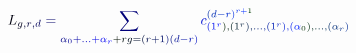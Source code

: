 \documentclass[12pt]{article}
\begin{document}
\makeatletter
\renewcommand*{\@textcolor}[3]{%
  \protect\leavevmode
  \begingroup
    \color#1{#2}#3%
  \endgroup
}
\makeatother
\begin{displaymath}
\mathcolor[RGB]{0,0,15}{L} _ { \mathcolor[RGB]{0,0,30}{g} \mathcolor[RGB]{0,0,45}{,} \mathcolor[RGB]{0,0,60}{r} \mathcolor[RGB]{0,0,75}{,} \mathcolor[RGB]{0,0,90}{d} } \mathcolor[RGB]{0,0,105}{=} \mathcolor[RGB]{0,0,120}{\sum} _ { \mathcolor[RGB]{0,0,135}{\alpha} _ { \mathcolor[RGB]{0,0,150}{0} } \mathcolor[RGB]{0,0,165}{+} \mathcolor[RGB]{0,0,180}{.} \mathcolor[RGB]{0,0,195}{.} \mathcolor[RGB]{0,0,210}{.} \mathcolor[RGB]{0,0,225}{+} \mathcolor[RGB]{0,0,240}{\alpha} _ { \mathcolor[RGB]{0,0,255}{r} } \mathcolor[RGB]{0,15,0}{+} \mathcolor[RGB]{0,15,15}{r} \mathcolor[RGB]{0,15,30}{g} \mathcolor[RGB]{0,15,45}{=} \mathcolor[RGB]{0,15,60}{(} \mathcolor[RGB]{0,15,75}{r} \mathcolor[RGB]{0,15,90}{+} \mathcolor[RGB]{0,15,105}{1} \mathcolor[RGB]{0,15,120}{)} \mathcolor[RGB]{0,15,135}{(} \mathcolor[RGB]{0,15,150}{d} \mathcolor[RGB]{0,15,165}{-} \mathcolor[RGB]{0,15,180}{r} \mathcolor[RGB]{0,15,195}{)} } \mathcolor[RGB]{0,15,210}{c} _ { \mathcolor[RGB]{0,15,225}{(} \mathcolor[RGB]{0,15,240}{1} ^ { \mathcolor[RGB]{0,15,255}{r} } \mathcolor[RGB]{0,30,0}{)} \mathcolor[RGB]{0,30,15}{,} \mathcolor[RGB]{0,30,30}{(} \mathcolor[RGB]{0,30,45}{1} ^ { \mathcolor[RGB]{0,30,60}{r} } \mathcolor[RGB]{0,30,75}{)} \mathcolor[RGB]{0,30,90}{,} \mathcolor[RGB]{0,30,105}{.} \mathcolor[RGB]{0,30,120}{.} \mathcolor[RGB]{0,30,135}{.} \mathcolor[RGB]{0,30,150}{,} \mathcolor[RGB]{0,30,165}{(} \mathcolor[RGB]{0,30,180}{1} ^ { \mathcolor[RGB]{0,30,195}{r} } \mathcolor[RGB]{0,30,210}{)} \mathcolor[RGB]{0,30,225}{,} \mathcolor[RGB]{0,30,240}{(} \mathcolor[RGB]{0,30,255}{\alpha} _ { \mathcolor[RGB]{0,45,0}{0} } \mathcolor[RGB]{0,45,15}{)} \mathcolor[RGB]{0,45,30}{,} \mathcolor[RGB]{0,45,45}{.} \mathcolor[RGB]{0,45,60}{.} \mathcolor[RGB]{0,45,75}{.} \mathcolor[RGB]{0,45,90}{,} \mathcolor[RGB]{0,45,105}{(} \mathcolor[RGB]{0,45,120}{\alpha} _ { \mathcolor[RGB]{0,45,135}{r} } \mathcolor[RGB]{0,45,150}{)} } ^ { \mathcolor[RGB]{0,45,165}{(} \mathcolor[RGB]{0,45,180}{d} \mathcolor[RGB]{0,45,195}{-} \mathcolor[RGB]{0,45,210}{r} \mathcolor[RGB]{0,45,225}{)} ^ { \mathcolor[RGB]{0,45,240}{r} \mathcolor[RGB]{0,45,255}{+} \mathcolor[RGB]{0,60,0}{1} } }
\end{displaymath}
\end{document}
